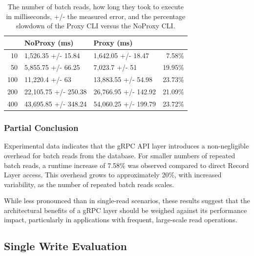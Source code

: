 \documentclass[sigconf]{acmart}
\begin{document}
\begin{table}[h]
\begin{tabular}{|r|l|l|r|}
    \hline
    \rowcolor[HTML]{656565} 
    \multicolumn{1}{|l|}{\cellcolor[HTML]{656565}{\color[HTML]{FFFFFF} \textbf{Reads}}} &
        {\color[HTML]{FFFFFF} \textbf{NoProxy (ms)}} &
        {\color[HTML]{FFFFFF} \textbf{Proxy (ms)}} &
        \multicolumn{1}{l|}{\cellcolor[HTML]{656565}{\color[HTML]{FFFFFF} \textbf{Slowdown}}} \\ \hline
    10  & 1,526.35 +/- 15.84   & 1,642.05 +/- 18.47   & 7.58\%  \\
    \rowcolor[HTML]{EFEFEF} 
    50  & 5,855.75 +/- 66.25   & 7,023.7 +/- 51       & 19.95\% \\
    100 & 11,220.4 +/- 63      & 13,883.55 +/- 54.98  & 23.73\% \\
    \rowcolor[HTML]{EFEFEF} 
    200 & 22,105.75 +/- 250.38 & 26,766.95 +/- 142.92 & 21.09\% \\
    400 & 43,695.85 +/- 348.24 & 54,060.25 +/- 199.79 & 23.72\% \\ \hline
\end{tabular}
\caption{The number of batch reads, how long they took to execute in milliseconds, +/- the measured error, and the percentage slowdown of the Proxy CLI versus the NoProxy CLI.}
\end{table}

\subsubsection{Partial Conclusion}

Experimental data indicates that the gRPC API layer introduces a non-negligible overhead for batch reads from the database. For smaller numbers of repeated batch reads, a runtime increase of 7.58\% was observed compared to direct Record Layer access. This overhead grows to approximately 20\%, with increased variability, as the number of repeated batch reads scales.

While less pronounced than in single-read scenarios, these results suggest that the architectural benefits of a gRPC layer should be weighed against its performance impact, particularly in applications with frequent, large-scale read operations.

\subsection{Single Write Evaluation}
\end{document}

